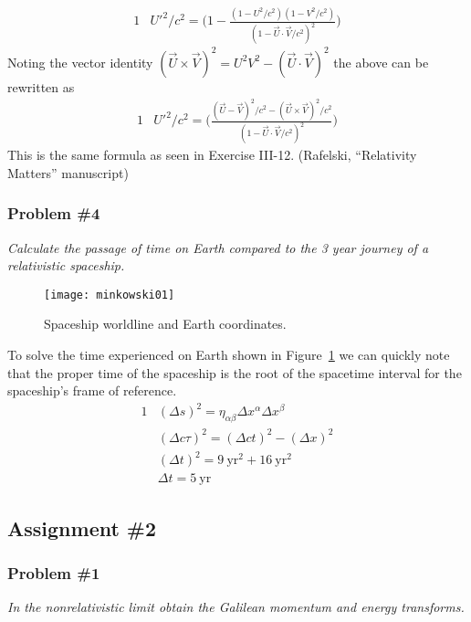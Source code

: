 \documentclass[]{article}
\numberwithin{equation}{subsection}
\begin{document}
\begin{alignat}{1}
	\label{a16}	&{U'}^{2}/c^{2}=\Big(1-\frac{(1-U^{2}/c^{2})(1-V^{2}/c^{2})}{(1-\vec{U}\cdot\vec{V}/c^{2})^{2}}\Big)
\end{alignat}
Noting the vector identity $(\vec{U}\times\vec{V})^{2}=U^{2}V^{2}-(\vec{U}\cdot\vec{V})^{2}$ the above can be rewritten as
\begin{alignat}{1}
	\label{a17}	&{U'}^{2}/c^{2}=\Big(\frac{(\vec{U}-\vec{V})^{2}/c^{2}-(\vec{U}\times\vec{V})^{2}/c^{2}}{(1-\vec{U}\cdot\vec{V}/c^{2})^{2}}\Big)
\end{alignat}
This is the same formula as seen in Exercise III-12. (Rafelski, ``Relativity Matters'' manuscript)
\subsubsection*{Problem \#4}
\emph{Calculate the passage of time on Earth compared to the 3 year journey of a relativistic spaceship.}\\

\begin{figure}[htbp]
	\centering
	\texttt{[image: minkowski01]}
	\caption{Spaceship worldline and Earth coordinates.}
	\label{fig01}
\end{figure}
\noindent To solve the time experienced on Earth shown in Figure~\ref{fig01} we can quickly note that the proper time of the spaceship is the root of the spacetime interval for the spaceship's frame of reference.
\begin{alignat}{1}
	\label{a18}	&(\Delta s)^{2} = \eta_{\alpha\beta}\Delta x^{\alpha}\Delta x^{\beta}\\
	\label{a19}	&(\Delta c\tau)^{2} = (\Delta ct)^{2} - (\Delta x)^{2}\\
	\label{a20}	&(\Delta t)^{2} = 9\ \mathrm{yr}^{2} + 16\ \mathrm{yr}^{2}\\
	\label{a21}	&\Delta t = 5\ \mathrm{yr}
\end{alignat}
\subsection{Assignment \#2}
\subsubsection*{Problem \#1}
\emph{In the nonrelativistic limit obtain the Galilean momentum and energy transforms.}\\
\end{document}
